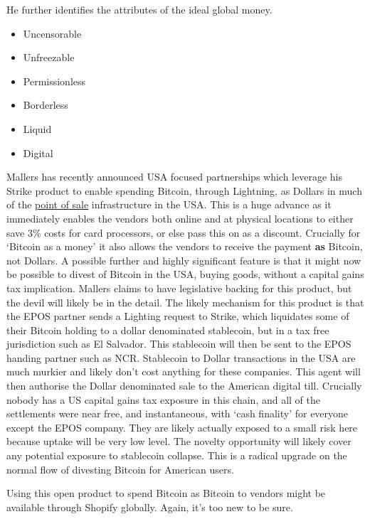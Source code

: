 He further identifies the attributes of the ideal global money. 
\begin{itemize}
\item Uncensorable
\item Unfreezable
\item Permissionless
\item Borderless
\item Liquid
\item Digital
\end{itemize}
Mallers has recently announced USA focused partnerships which leverage his Strike product to enable spending Bitcoin, through Lightning, as Dollars in much of the \href{https://www.ncr.com/point-of-sale-pos-systems}{point of sale} infrastructure in the USA. This is a huge advance as it immediately enables the vendors both online and at physical locations to either save 3\% costs for card processors, or else pass this on as a discount. Crucially for `Bitcoin as a money' it also allows the vendors to receive the payment \textbf{as} Bitcoin, not Dollars. A possible further and highly significant feature is that it might now be possible to divest of Bitcoin in the USA, buying goods, without a capital gains tax implication. Mallers claims to have legislative backing for this product, but the devil will likely be in the detail. The likely mechanism for this product is that the EPOS partner sends a Lighting request to Strike, which liquidates some of their Bitcoin holding to a dollar denominated stablecoin, but in a tax free jurisdiction such as El Salvador. This stablecoin will then be sent to the EPOS handing partner such as NCR. Stablecoin to Dollar transactions in the USA are much murkier and likely don't cost anything for these companies. This agent will then authorise the Dollar denominated sale to the American digital till. Crucially nobody has a US capital gains tax exposure in this chain, and all of the settlements were near free, and instantaneous, with `cash finality' for everyone except the EPOS company. They are likely actually exposed to a small risk here because uptake will be very low level. The novelty opportunity will likely cover any potential exposure to stablecoin collapse. This is a radical upgrade on the normal flow of divesting Bitcoin for American users. \par
Using this open product to spend Bitcoin as Bitcoin to vendors might be available through Shopify globally. Again, it's too new to be sure.\par
